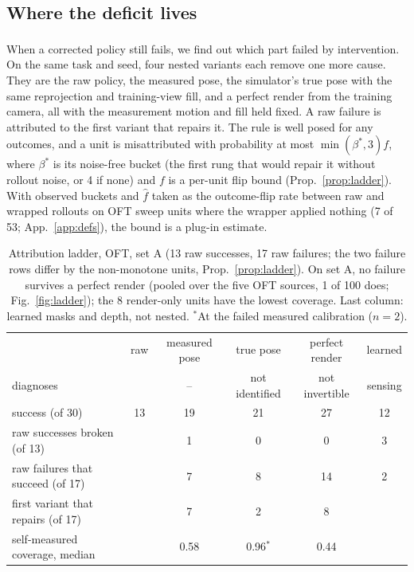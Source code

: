 \documentclass{article}
\newcommand{\ph}{\textsuperscript{\dag}}
\begin{document}
\subsection{Where the deficit lives}
\label{sec:ladder}
When a corrected policy still fails, we find out which part failed by intervention\ph. On the same task and seed, four
nested variants each remove one more cause. They are the raw policy, the measured pose, the simulator's true pose with
the same reprojection and training-view fill, and a perfect render from the training camera, all with the measurement
motion and fill held fixed. A raw failure is attributed to the first variant that repairs it. The rule is well posed for
any outcomes, and a unit is misattributed with probability at most $\min(\beta^*, 3) f$, where $\beta^*$ is its
noise-free bucket (the first rung that would repair it without rollout noise, or 4 if none) and $f$ is a per-unit flip
bound (Prop.~\ref{prop:ladder}). With observed buckets and $\hat f$ taken as the outcome-flip rate between raw and
wrapped rollouts on OFT sweep units where the wrapper applied nothing (7 of 53; App.~\ref{app:defs}), the bound is a
plug-in estimate.

\begin{table}[t]
\centering\small
\caption{Attribution ladder, OFT, set A (13 raw successes, 17 raw failures; the two failure rows differ by the
non-monotone units, Prop.~\ref{prop:ladder}). On set A, no failure survives a perfect render (pooled over the five OFT
sources, 1 of 100 does; Fig.~\ref{fig:ladder}); the 8 render-only units have the lowest coverage. Last column: learned
masks and depth, not nested. $^*$At the failed measured calibration ($n = 2$).}
\label{tab:ladder}
\setlength{\tabcolsep}{4pt}
\begin{tabular}{lcccc|c}
\toprule
 & raw & measured pose & true pose & perfect render & learned \\
diagnoses & & -- & not identified & not invertible & sensing \\
\midrule
success (of 30) & 13 & 19 & 21 & 27 & 12 \\
raw successes broken (of 13) & & 1 & 0 & 0 & 3 \\
raw failures that succeed (of 17) & & 7 & 8 & 14 & 2 \\
first variant that repairs (of 17) & & 7 & 2 & 8 & \\
self-measured coverage, median & & 0.58 & 0.96$^*$ & 0.44 & \\
\bottomrule
\end{tabular}
\end{table}
\end{document}
